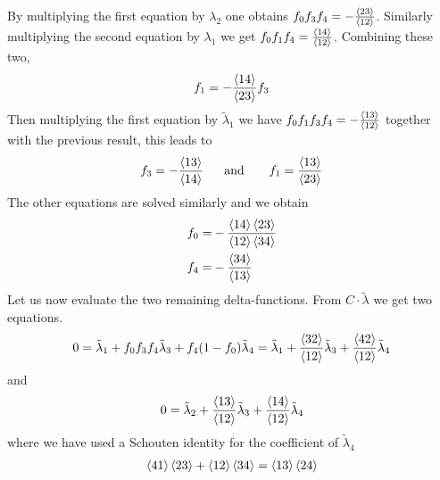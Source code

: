 \documentclass[letter,11pt]{article}
\begin{document}
By multiplying the first equation by $ \lambda_2$ one obtains $f_0f_3f_4=-\frac{\expval{23}}{\expval{12}}$. Similarly multiplying the second equation by $ \lambda_1$ we get $f_0f_1f_4= \frac{\expval{14}}{\expval{12}}$. Combining these two,
\begin{equation}
	\begin{aligned}
		f_1=-\frac{\expval{14}}{\expval{23}}f_3
	\end{aligned}
\end{equation}
Then multiplying the first equation by $\tilde\lambda_1$ we have $f_0f_1f_3f_4=-\frac{\expval{13}}{\expval{12}}$ together with the previous result, this leads to
\begin{equation}
	\begin{aligned}
		f_3 =-\frac{\expval{13}}{\expval{14}} ~~~~~\text{and }~~~~~f_1 =\frac{\expval{13}}{\expval{23}} 
	\end{aligned}
\end{equation}
The other equations are solved similarly and we obtain
\begin{equation}
	\begin{aligned}
		f_0=&-\frac{\expval{14}\expval{23}}{\expval{12}\expval{34}}\\
		f_4=&-\frac{\expval{34}}{\expval{13}} 
	\end{aligned}
\end{equation}
Let us now evaluate the two remaining delta-functions. From $C\cdot \tilde \lambda$ we get two equations. 
\begin{equation}
	\begin{aligned}
		0=\tilde\lambda_1+f_0f_3f_4 \tilde\lambda_3+f_4(1-f_0)\tilde\lambda_4=\tilde\lambda_1+\frac{\expval{32}}{\expval{12}} \tilde\lambda_3+\frac{\expval{42}}{\expval{12}} \tilde\lambda_4
	\end{aligned}
\end{equation}
and
\begin{equation}
	\begin{aligned}
		0=\tilde\lambda_2+\frac{\expval{13}}{\expval{12}} \tilde\lambda_3+\frac{\expval{14}}{\expval{12}} \tilde\lambda_4
	\end{aligned}
\end{equation}
where we have used a Schouten identity for the coefficient of $\tilde\lambda_4$
\begin{equation}
	\begin{aligned}
		\expval{41}\expval{23}+\expval{12}\expval{34}=\expval{13}\expval{24}
	\end{aligned}
\end{equation}
\end{document}
